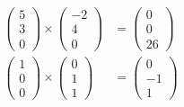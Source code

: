 \documentclass[a4paper]{article}
\begin{document}
\subsection{}
  \begin{align*}
    \begin{pmatrix}
      5 \\ 3 \\ 0
    \end{pmatrix}
    \times
    \begin{pmatrix}
      -2 \\ 4 \\ 0
    \end{pmatrix}
    &=
    \begin{pmatrix}
      0 \\ 0 \\ 26
    \end{pmatrix}
    \\[1em]
    \begin{pmatrix}
      1 \\ 0 \\ 0
    \end{pmatrix}
    \times
    \begin{pmatrix}
      0 \\ 1 \\ 1
    \end{pmatrix}
    &=
    \begin{pmatrix}
      0 \\ -1 \\ 1
    \end{pmatrix}
  \end{align*}
\end{document}
